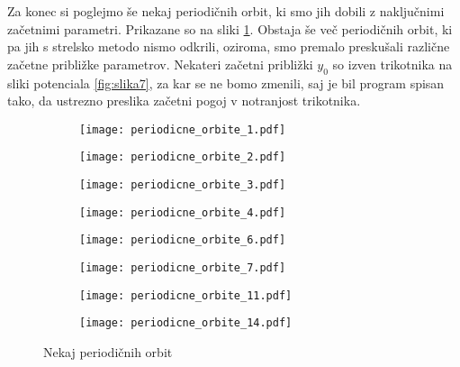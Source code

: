 \documentclass[12pt,a4paper]{article}
\begin{document}
Za konec si poglejmo še nekaj periodičnih orbit, ki smo jih dobili z naključnimi začetnimi parametri. Prikazane so na sliki \ref{fig:slika11}. Obstaja še več periodičnih orbit, ki pa jih s strelsko metodo nismo odkrili, oziroma, smo premalo preskušali različne začetne približke parametrov. Nekateri začetni približki $y_0$ so izven trikotnika na sliki potenciala \ref{fig:slika7}, za kar se ne bomo zmenili, saj je bil program spisan tako, da ustrezno preslika začetni pogoj v notranjost trikotnika.

\begin{figure}[H]
    \centering
    \begin{subfigure}[b]{0.45\textwidth}  			
        \texttt{[image: periodicne\_orbite\_1.pdf]}
    \end{subfigure}
    \begin{subfigure}[b]{0.45\textwidth}  			
        \texttt{[image: periodicne\_orbite\_2.pdf]}
    \end{subfigure}
   
    \begin{subfigure}[b]{0.45\textwidth}  			
        \texttt{[image: periodicne\_orbite\_3.pdf]}
    \end{subfigure}
    \begin{subfigure}[b]{0.45\textwidth}  			
        \texttt{[image: periodicne\_orbite\_4.pdf]}
    \end{subfigure}
    
    \begin{subfigure}[b]{0.45\textwidth}  			
        \texttt{[image: periodicne\_orbite\_6.pdf]}
    \end{subfigure}
    \begin{subfigure}[b]{0.45\textwidth}  			
        \texttt{[image: periodicne\_orbite\_7.pdf]}
    \end{subfigure}
    
        \begin{subfigure}[b]{0.45\textwidth}  			
        \texttt{[image: periodicne\_orbite\_11.pdf]}
    \end{subfigure}
    \begin{subfigure}[b]{0.45\textwidth}  			
        \texttt{[image: periodicne\_orbite\_14.pdf]}
    \end{subfigure}
    \caption{Nekaj periodičnih orbit} 
    \label{fig:slika11}
\end{figure}
\end{document}
